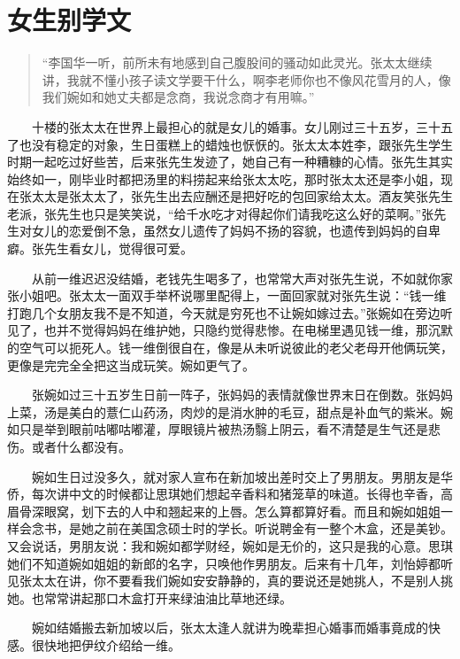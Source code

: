 \documentclass[12pt,UTF8]{ctexbook}
\begin{document}
\hypertarget{ux5973ux751fux522bux5b66ux6587}{%
\section*{女生别学文}\label{ux5973ux751fux522bux5b66ux6587}}

\begin{quote}
\enquote{李国华一听，前所未有地感到自己腹股间的骚动如此灵光。张太太继续讲，我就不懂小孩子读文学要干什么，啊李老师你也不像风花雪月的人，像我们婉如和她丈夫都是念商，我说念商才有用嘛。}
\end{quote}

　　十楼的张太太在世界上最担心的就是女儿的婚事。女儿刚过三十五岁，三十五了也没有稳定的对象，生日蛋糕上的蜡烛也恹恹的。张太太本姓李，跟张先生学生时期一起吃过好些苦，后来张先生发迹了，她自己有一种糟糠的心情。张先生其实始终如一，刚毕业时都把汤里的料捞起来给张太太吃，那时张太太还是李小姐，现在张太太是张太太了，张先生出去应酬还是把好吃的包回家给太太。酒友笑张先生老派，张先生也只是笑笑说，\enquote{给千水吃才对得起你们请我吃这么好的菜啊。}张先生对女儿的恋爱倒不急，虽然女儿遗传了妈妈不扬的容貌，也遗传到妈妈的自卑癖。张先生看女儿，觉得很可爱。

　　从前一维迟迟没结婚，老钱先生喝多了，也常常大声对张先生说，不如就你家张小姐吧。张太太一面双手举杯说哪里配得上，一面回家就对张先生说：\enquote{钱一维打跑几个女朋友我不是不知道，今天就是穷死也不让婉如嫁过去。}张婉如在旁边听见了，也并不觉得妈妈在维护她，只隐约觉得悲惨。在电梯里遇见钱一维，那沉默的空气可以扼死人。钱一维倒很自在，像是从未听说彼此的老父老母开他俩玩笑，更像是完完全全把这当成玩笑。婉如更气了。

　　张婉如过三十五岁生日前一阵子，张妈妈的表情就像世界末日在倒数。张妈妈上菜，汤是美白的薏仁山药汤，肉炒的是消水肿的毛豆，甜点是补血气的紫米。婉如只是举到眼前咕嘟咕嘟灌，厚眼镜片被热汤翳上阴云，看不清楚是生气还是悲伤。或者什么都没有。

　　婉如生日过没多久，就对家人宣布在新加坡出差时交上了男朋友。男朋友是华侨，每次讲中文的时候都让思琪她们想起辛香料和猪笼草的味道。长得也辛香，高眉骨深眼窝，划下去的人中和翘起来的上唇。怎么算都算好看。而且和婉如姐姐一样会念书，是她之前在美国念硕士时的学长。听说聘金有一整个木盒，还是美钞。又会说话，男朋友说：我和婉如都学财经，婉如是无价的，这只是我的心意。思琪她们不知道婉如姐姐的新郎的名字，只唤他作男朋友。后来有十几年，刘怡婷都听见张太太在讲，你不要看我们婉如安安静静的，真的要说还是她挑人，不是别人挑她。也常常讲起那口木盒打开来绿油油比草地还绿。

　　婉如结婚搬去新加坡以后，张太太逢人就讲为晚辈担心婚事而婚事竟成的快感。很快地把伊纹介绍给一维。
\end{document}

